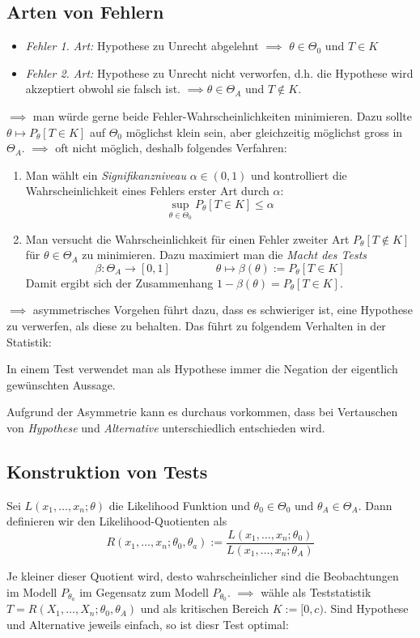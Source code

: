 \subsection*{Arten von Fehlern}
\begin{itemize}
\item \textit{Fehler 1. Art:} Hypothese zu Unrecht abgelehnt $\implies$ $\theta \in \Theta_0$ und $T\in K$
\item \textit{Fehler 2. Art:} Hypothese zu Unrecht nicht verworfen, d.h. die Hypothese wird akzeptiert obwohl sie falsch ist. $\implies \theta \in \Theta_A$ und $T\notin K$.
\end{itemize}
$\implies$ man würde gerne beide Fehler-Wahrscheinlichkeiten minimieren. Dazu sollte $\theta \mapsto P_\theta[T \in K]$ auf $\Theta_0$ möglichst klein sein, aber gleichzeitig möglichst gross in $\Theta_A$. $\implies$ oft nicht möglich, deshalb folgendes Verfahren:
\begin{enumerate}
\item Man wählt ein \textit{Signifikanzniveau} $\alpha \in (0,1)$ und kontrolliert die Wahrscheinlichkeit eines Fehlers erster Art durch $\alpha$:
$$ \sup_{\theta \in \Theta_0} P_\theta [T \in K] \leq \alpha $$
\item Man versucht die Wahrscheinlichkeit für einen Fehler zweiter Art $P_\theta[T \notin K]$ für $\theta \in \Theta_A$ zu minimieren. Dazu maximiert man die \textit{Macht des Tests} $$\beta:\Theta_A \to [0,1] \quad \quad \quad \quad \theta \mapsto \beta(\theta) := P_\theta[T \in K]$$
Damit ergibt sich der Zusammenhang $1-\beta(\theta) = P_\theta[T \in K]$.
\end{enumerate}

$\implies$ asymmetrisches Vorgehen führt dazu, dass es schwieriger ist, eine Hypothese zu verwerfen, als diese zu behalten. Das führt zu folgendem Verhalten in der Statistik:
\begin{mdframed}[backgroundcolor=red!20]
In einem Test verwendet man als Hypothese immer die Negation der eigentlich gewünschten Aussage.
\end{mdframed}
Aufgrund der Asymmetrie kann es durchaus vorkommen, dass bei Vertauschen von \textit{Hypothese} und \textit{Alternative} unterschiedlich entschieden wird.

\subsection{Konstruktion von Tests}
\begin{definition}
Sei $L(x_1,\dots,x_n;\theta)$ die Likelihood Funktion und $\theta_0 \in \Theta_0$ und $\theta_A \in \Theta_A$. Dann definieren wir den Likelihood-Quotienten als
$$ R(x_1,\dots,x_n; \theta_0, \theta_a ) := \frac{L(x_1,\dots,x_n; \theta_0)}{L(x_1,\dots,x_n;\theta_A)}$$
\end{definition}
Je kleiner dieser Quotient wird, desto wahrscheinlicher sind die Beobachtungen im Modell $P_{\theta_a}$ im Gegensatz zum Modell $P_{\theta_0}$. $\implies$ wähle als Teststatistik $T= R(X_1,\dots, X_n; \theta_0, \theta_A)$ und als kritischen Bereich $K:=[0,c)$. Sind Hypothese und Alternative jeweils einfach, so ist diesr Test optimal:

